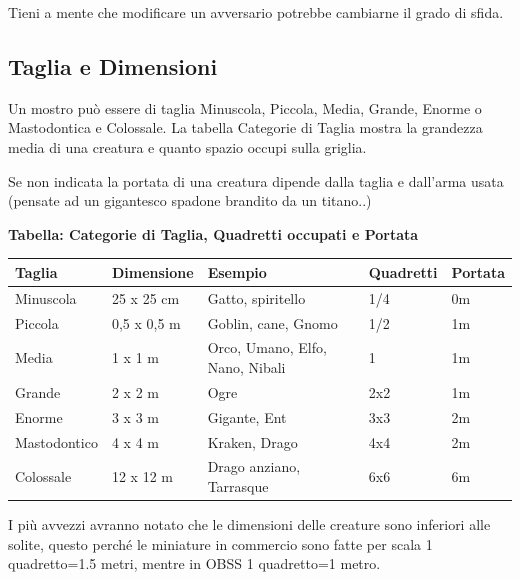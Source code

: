 \begin{multicols}{2}
Tieni a mente che modificare un avversario potrebbe cambiarne il grado di sfida.

\subsection{Taglia e Dimensioni}

Un mostro può essere di taglia Minuscola, Piccola, Media, Grande, Enorme o Mastodontica e Colossale. La tabella Categorie di Taglia mostra la grandezza media di una creatura e quanto spazio occupi sulla griglia.

Se non indicata la portata di una creatura dipende dalla taglia e dall'arma usata (pensate ad un gigantesco spadone brandito da un titano..)

\end{multicols}

\textbf{Tabella: Categorie di Taglia, Quadretti occupati e Portata}\label{tagliaedimensioni}\hypertarget{tagliaedimensioni}{}

\medskip

\noindent\begin{tabularx}{\linewidth}{Xllll}
	\toprule
\rowcolor{gray!20}\textbf{Taglia}& \textbf{Dimensione} & \textbf{Esempio}&\textbf{Quadretti}&\textbf{Portata}\\
\toprule
Minuscola & 25 x 25 cm&Gatto, spiritello& 1/4&0m\\
\rowcolor{gray!20}Piccola & 0,5 x 0,5 m & Goblin, cane, Gnomo&1/2&1m\\
Media & 1 x 1 m & Orco, Umano, Elfo, Nano, Nibali &1&1m\\
\rowcolor{gray!20}Grande & 2 x 2 m& Ogre&2x2&1m\\
Enorme & 3 x 3 m & Gigante, Ent&3x3&2m\\
\rowcolor{gray!20}Mastodontico & 4 x 4 m&Kraken, Drago&4x4&2m\\
Colossale & 12 x 12 m&Drago anziano, Tarrasque&6x6&6m
\end{tabularx}

\medskip

I più avvezzi avranno notato che le dimensioni delle creature sono inferiori alle solite, questo perché le miniature in commercio sono fatte per scala 1 quadretto=1.5 metri, mentre in OBSS 1 quadretto=1 metro.

